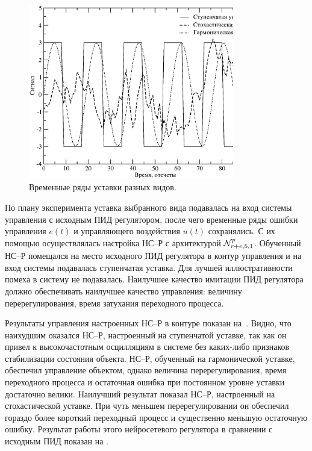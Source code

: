 \begin{figure}
\centering
\includegraphics[width=0.8\textwidth,%
  totalheight=0.35\textheight]{probe_signals_rus}
\caption{Временные ряды уставки разных видов.}\label{fig:probe_signals}
\end{figure}

По плану эксперимента уставка выбранного вида подавалась на вход
системы управления с исходным ПИД регулятором, после чего временные
ряды ошибки управления $e(t)$ и управляющего воздействия $u(t)$
сохранялись.  С их помощью осуществлялась настройка НС--Р с
архитектурой $\mathcal{N}^p_{r+e,5,1}$.  Обученный НС--Р помещался на место
исходного ПИД регулятора в контур управления и на вход системы
подавалась ступенчатая уставка.  Для лучшей иллюстративности помеха в
систему не подавалась.  Наилучшее качество имитации ПИД регулятора
должно обеспечивать наилучшее качество управления: величину
перерегулирования, время затухания переходного процесса.

Результаты управления настроенных НС--Р в контуре показан
на~.  Видно, что наихудшим оказался
НС--Р, настроенный на ступенчатой уставке, так как он привел к
высокочастотным осцилляциям в системе без каких-либо признаков
стабилизации состояния объекта.  НС--Р, обученный на гармонической
уставке, обеспечил управление объектом, однако величина
перерегулирования, время переходного процесса и остаточная ошибка при
постоянном уровне уставки достаточно велики.  Наилучший результат
показал НС--Р, настроенный на стохастической уставке.  При чуть
меньшем перерегулировании он обеспечил гораздо более короткий
переходный процесс и существенно меньшую остаточную ошибку.  Результат
работы этого нейросетевого регулятора в сравнении с исходным ПИД
показан на .

